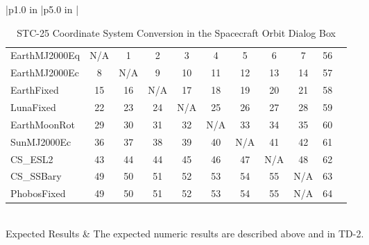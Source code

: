 \begin{table}[htbp!]
\begin{tabular}{|p{1.0 in} |p{5.0 in} |}
\begin{centering}
\begin{tabular}{|l|c|c|c|c|c|c|c|c|c|c|}
             \rotatebox{90}{ CS\_ESL2  } &
             \rotatebox{90}{ CS\_SSBary  } &
             \rotatebox{90}{ PhobosFixed  }   \\ \hline
             EarthMJ2000Eq & N/A & 1 & 2 & 3 & 4 & 5 & 6 & 7 & 56\\ \hline
             EarthMJ2000Ec & 8 & N/A & 9 & 10 & 11 & 12 & 13 & 14 & 57\\ \hline
             EarthFixed & 15 & 16 & N/A & 17 & 18 & 19 & 20 & 21 & 58\\ \hline
             LunaFixed & 22 & 23 & 24 & N/A & 25 & 26 & 27 & 28 & 59\\ \hline
             EarthMoonRot & 29 & 30 & 31 & 32 & N/A & 33 & 34 & 35 & 60\\ \hline
             SunMJ2000Ec & 36 & 37 & 38 & 39 & 40 &  N/A & 41 & 42 & 61\\ \hline
             CS\_ESL2 & 43 & 44 & 44 & 45 & 46 & 47 & N/A & 48 & 62\\ \hline
             CS\_SSBary & 49 & 50 & 51 & 52 & 53 & 54 & 55 & N/A & 63\\ \hline
             PhobosFixed & 49 & 50 & 51 & 52 & 53 & 54 & 55 & N/A & 64\\ \hline
          \end{tabular}
          \end{centering} \vspace{0.1 in}\\
         \hline
         Expected Results & The expected numeric results are described above and in TD-2.\\
      \hline
\end{tabular}
   \label{Table:STC-25}
   \caption{STC-25 Coordinate System Conversion in the Spacecraft Orbit Dialog Box}
\end{table} 